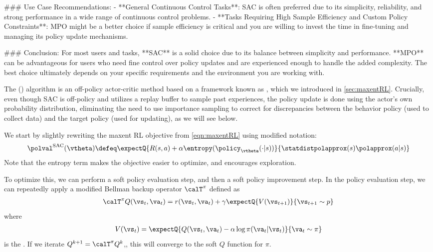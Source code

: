 {### Use Case Recommendations:
- **General Continuous Control Tasks**: SAC is often preferred due to its simplicity, reliability, and strong performance in a wide range of continuous control problems.
- **Tasks Requiring High Sample Efficiency and Custom Policy Constraints**: MPO might be a better choice if sample efficiency is critical and you are willing to invest the time in fine-tuning and managing its policy update mechanisms.

### Conclusion:
For most users and tasks, **SAC** is a solid choice due to its balance between simplicity and performance. **MPO** can be advantageous for users who need fine control over policy updates and are experienced enough to handle the added complexity. The best choice ultimately depends on your specific requirements and the environment you are working with.
}


The   ()
algorithm \citep{SAC,Haarnoja2018SAC}
is an off-policy
actor-critic method based on
a framework known as ,
which we introduced in 
\cref{sec:maxentRL}.
Crucially, even though
SAC is off-policy and utilizes a replay buffer to sample past experiences,
the policy update is done using the actor's own probability distribution,
eliminating the need to use importance sampling
to correct for discrepancies between the behavior policy
(used to collect data) and the target policy (used for updating),
as we will see below.

We start by slightly rewriting
the maxent RL objective from
\cref{eqn:maxentRL} using modified notation:
\begin{align}
\polval^{\text{SAC}}(\vtheta) \defeq \expectQ{R(s,a)
+ \alpha \entropy(\policy_{\vtheta}(\cdot|s))}{\statdistpolapprox(s)\polapprox(a|s)}
\end{align}
Note that the entropy term makes the objective easier to optimize,
and encourages  exploration.


To optimize this, we can perform a soft policy evaluation step,
and then a soft policy improvement step.
In the policy evaluation step, we can repeatedly apply a modified Bellman
backup operator $\calT^{\pi}$ defined as
\begin{align}
  \calT^{\pi} Q(\vs_t,\va_t) = r(\vs_t,\va_t) +
  \gamma \expectQ{V(\vs_{t+1})}{\vs_{t+1} \sim p}
  \end{align}
where 
\begin{align}
  V(\vs_t) = \expectQ{
    Q(\vs_t,\va_t) - \alpha \log \pi(\va_t|\vs_t)}{\va_t \sim \pi}
  \label{eqn:softValue}
  \end{align}
is the .
If we iterate $Q^{k+1} = \calT^{\pi} Q^k$,,
this will converge to the soft $Q$ function for $\pi$.


